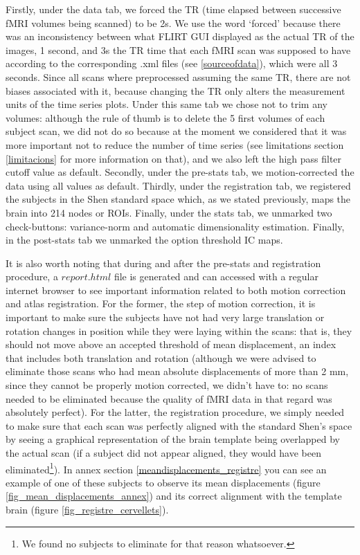 \documentclass[a4paper,12pt]{elsarticle}  %
\begin{document}
Firstly, under the data tab, we forced the TR (time elapsed between successive fMRI volumes being scanned) to be 2s. We use the word `forced' because there was an inconsistency between what FLIRT GUI displayed as the actual TR of the images, 1 second, and 3s the TR time that each fMRI scan was supposed to have according to the corresponding .xml files (see \ref{sourceofdata}), which were all 3 seconds. Since all scans where preprocessed assuming the same TR, there are not biases associated with it, because changing the TR only alters the measurement units of the time series plots\cite{melodic_web}. Under this same tab we chose not to trim any volumes: although the rule of thumb is to delete the 5 first volumes of each subject scan, we did not do so because at the moment we considered that it was more important not to reduce the number of time series (see limitations section \ref{limitacions} for more information on that), and we also left the high pass filter cutoff value as default. Secondly, under the pre-stats tab, we motion-corrected the data using all values as default. Thirdly, under the registration tab, we registered the subjects in the Shen standard space\cite{Shen2014147} which, as we stated previously, maps the brain into 214 nodes or ROIs. Finally, under the stats tab, we unmarked two check-buttons: variance-norm and automatic dimensionality estimation. Finally, in the post-stats tab we unmarked the option threshold IC maps.

It is also worth noting that during and after the pre-stats and registration procedure, a $report.html$ file is generated and can accessed with a regular internet browser to see important information related to both motion correction and atlas registration. For the former, the step of motion correction, it is important to make sure the subjects have not had very large translation or rotation changes in position while they were laying within the scans: that is, they should not move above an accepted threshold of mean displacement, an index that includes both translation and rotation (although we were advised to eliminate those scans who had mean absolute displacements of more than 2 mm, since they cannot be properly motion corrected, we didn't have to: no scans needed to be eliminated because the quality of fMRI data in that regard was absolutely perfect). For the latter, the registration procedure, we simply needed to make sure that each scan was perfectly aligned with the standard Shen's space by seeing a graphical representation of the brain template being overlapped by the actual scan (if a subject did not appear aligned, they would have been eliminated\footnote{We found no subjects to eliminate for that reason whatsoever.}). In annex section \ref{meandisplacements_registre} you can see an example of one of these subjects to observe its mean displacements (figure \ref{fig_mean_displacements_annex}) and its correct alignment with the template brain  (figure \ref{fig_registre_cervellets}).
\end{document}
